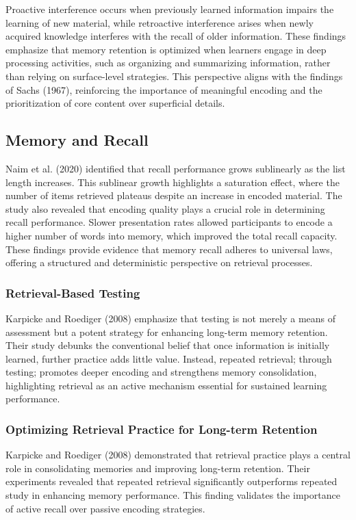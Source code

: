 Proactive interference occurs when previously learned information impairs the learning of new material, while retroactive interference arises when newly acquired knowledge interferes with the recall of older information. These findings emphasize that memory retention is optimized when learners engage in deep processing activities, such as organizing and summarizing information, rather than relying on surface-level strategies. This perspective aligns with the findings of Sachs (1967), reinforcing the importance of meaningful encoding and the prioritization of core content over superficial details.

\subsection{Memory and Recall}

Naim et al. (2020) identified that recall performance grows sublinearly as the list length increases. This sublinear growth highlights a saturation effect, where the number of items retrieved plateaus despite an increase in encoded material. The study also revealed that encoding quality plays a crucial role in determining recall performance. Slower presentation rates allowed participants to encode a higher number of words into memory, which improved the total recall capacity. These findings provide evidence that memory recall adheres to universal laws, offering a structured and deterministic perspective on retrieval processes.

\subsubsection{Retrieval-Based Testing}

Karpicke and Roediger (2008) emphasize that testing is not merely a means of assessment but a potent strategy for enhancing long-term memory retention. Their study debunks the conventional belief that once information is initially learned, further practice adds little value. Instead, repeated retrieval; through testing; promotes deeper encoding and strengthens memory consolidation, highlighting retrieval as an active mechanism essential for sustained learning performance.

\subsubsection{Optimizing Retrieval Practice for Long-term Retention}

Karpicke and Roediger (2008) demonstrated that retrieval practice plays a central role in consolidating memories and improving long-term retention. Their experiments revealed that repeated retrieval significantly outperforms repeated study in enhancing memory performance. This finding validates the importance of active recall over passive encoding strategies.


